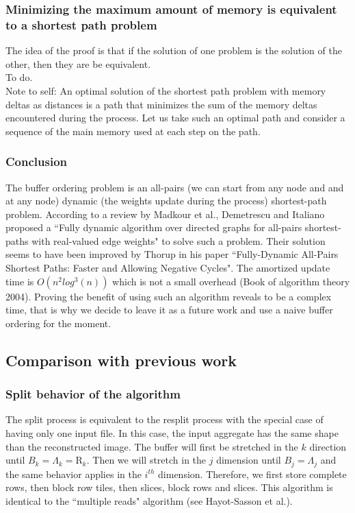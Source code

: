 \documentclass[conference]{IEEEtran}
\begin{document}
\subsubsection{Minimizing the maximum amount of memory is equivalent to a shortest path problem}
The idea of the proof is that if the solution of one problem is the solution of the other, then they are be equivalent. \\
To do. \\
Note to self: An optimal solution of the shortest path problem with memory deltas as distances is a path that minimizes the sum of the memory deltas encountered during the process.
Let us take such an optimal path and consider a sequence of the main memory used at each step on the path. \\

\subsubsection{Conclusion}
The buffer ordering problem is an all-pairs (we can start from any node and and at any node) dynamic (the weights update during the process) shortest-path problem.
According to a review by Madkour et al.\cite{shorestpathsurvey}, Demetrescu and Italiano proposed a ``Fully dynamic algorithm over directed graphs for all-pairs shortest-paths with real-valued edge weights"\cite{demetrescu} to solve such a problem.
Their solution seems to have been improved by Thorup in his paper ``Fully-Dynamic All-Pairs Shortest Paths: Faster and Allowing Negative Cycles"\cite{thorup}.
The amortized update time is $O(n^2log^3(n))$ which is not a small overhead (Book of algorithm theory 2004).
Proving the benefit of using such an algorithm reveals to be a complex time, that is why we decide to leave it as a future work and use a naive buffer ordering for the moment.

\subsection{Comparison with previous work}

\subsubsection{Split behavior of the algorithm}
The split process is equivalent to the resplit process with the special case of having only one input file.
In this case, the input aggregate has the same shape than the reconstructed image.
The buffer will first be stretched in the $k$ direction until $B_k = \Lambda_k = \textrm{R}_k$.
Then we will stretch in the $j$ dimension until $B_j = \Lambda_j$ and the same behavior applies in the $i^{th}$ dimension.
Therefore, we first store complete rows, then block row tiles, then slices, block rows and slices.
This algorithm is identical to the ``multiple reads" algorithm (see Hayot-Sasson et al.).
\end{document}
